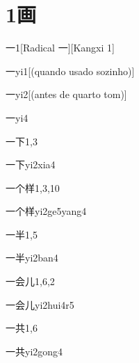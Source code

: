 
\section*{1画}

\begin{entry}{一}{1}[Radical 一][Kangxi 1]
  \begin{phonetics}{一}{yi1}[(quando usado sozinho)]
  \end{phonetics}
  \begin{phonetics}{一}{yi2}[(antes de quarto tom)]
  \end{phonetics}
  \begin{phonetics}{一}{yi4}
  \end{phonetics}
\end{entry}

\begin{entry}{一下}{1,3}
  \begin{phonetics}{一下}{yi2xia4}
  \end{phonetics}
\end{entry}

\begin{entry}{一个样}{1,3,10}
  \begin{phonetics}{一个样}{yi2ge5yang4}
  \end{phonetics}
\end{entry}

\begin{entry}{一半}{1,5}
  \begin{phonetics}{一半}{yi2ban4}
  \end{phonetics}
\end{entry}

\begin{entry}{一会儿}{1,6,2}
  \begin{phonetics}{一会儿}{yi2hui4r5}
  \end{phonetics}
\end{entry}

\begin{entry}{一共}{1,6}
  \begin{phonetics}{一共}{yi2gong4}
  \end{phonetics}
\end{entry}


